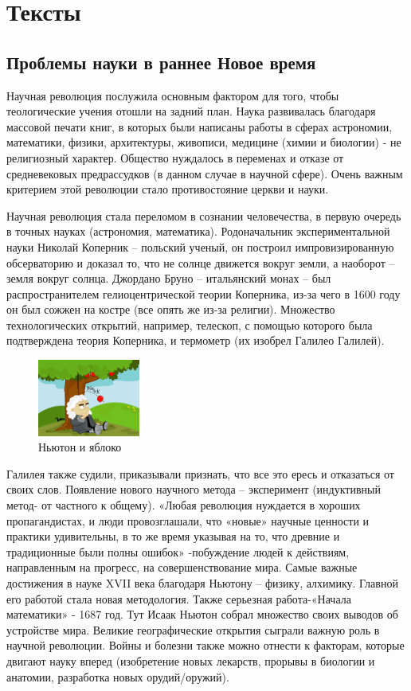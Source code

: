 \documentclass{report}
\begin{document}
\chapter{Тексты}
\section{Проблемы науки в раннее Новое время}


Научная революция послужила основным фактором для того, чтобы теологические учения отошли на задний план. Наука развивалась благодаря массовой печати книг, в которых были написаны работы в сферах астрономии, математики, физики, архитектуры, живописи, медицине (химии и биологии) - не религиозный характер. Общество нуждалось в переменах и отказе от средневековых предрассудков (в данном случае в научной сфере). Очень важным критерием этой революции стало противостояние церкви и науки.

Научная революция стала переломом в сознании человечества, в первую очередь в точных науках (астрономия, математика). Родоначальник экспериментальной науки Николай Коперник – польский ученый, он построил импровизированную обсерваторию и доказал то, что не солнце движется вокруг земли, а наоборот – земля вокруг солнца. Джордано Бруно – итальянский монах – был распространителем гелиоцентрической теории Коперника, из-за чего в 1600 году он был сожжен на костре (все опять же из-за религии). Множество технологических открытий, например, телескоп, с помощью которого была подтверждена теория Коперника, и термометр (их изобрел Галилео Галилей). 

\begin{figure}
  \centering
  \caption{Ньютон и яблоко }
  \includegraphics[width=0.3\textwidth]
    {newton_applepng.png}
\end{figure}

Галилея также судили, приказывали признать, что все это ересь и отказаться от своих слов. Появление нового научного метода – эксперимент (индуктивный метод- от частного к общему). «Любая революция нуждается в хороших пропагандистах, и люди провозглашали, что «новые» научные ценности и практики удивительны, в то же время указывая на то, что древние и традиционные были полны ошибок» -побуждение людей к действиям, направленным на прогресс, на совершенствование мира. Самые важные достижения в науке XVII века благодаря Ньютону – физику, алхимику. Главной его работой стала новая методология. Также серьезная работа-«Начала математики» - 1687 год. Тут Исаак Ньютон собрал множество своих выводов об устройстве мира. Великие географические открытия сыграли важную роль в научной революции. Войны и болезни также можно отнести к факторам, которые двигают науку вперед (изобретение новых лекарств, прорывы в биологии и анатомии, разработка новых орудий/оружий).
\end{document}
